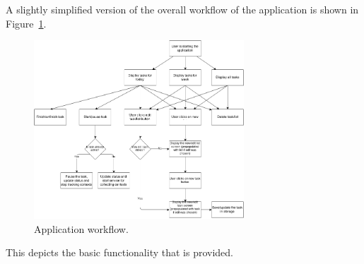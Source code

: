 A slightly simplified version of the overall workflow of the application is shown in Figure~\ref{fig:workflow}.
\begin{figure}[tbp]
  \centering
  \includegraphics[width=0.7\textwidth]{figures/Workflow.png}
  \caption[Application workflow]{Application workflow.}
  \label{fig:workflow}
\end{figure}
This depicts the basic functionality that is provided. 

